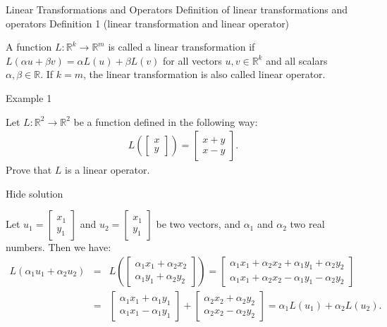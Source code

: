  
Linear Transformations and Operators
Definition of linear transformations and operators
Definition 1 (linear transformation and linear operator)


A function \( L:\mathbb R^k\to\mathbb R^m \) is called a linear transformation if \( L(\alpha u+\beta v)=\alpha L(u)+\beta L(v) \) for all vectors \( u,v\in\mathbb R^k \) and all scalars \( \alpha,\beta\in\mathbb R \). If \( k=m \), the linear transformation is also called linear operator.

Example 1

Let \( L:\mathbb R^2\to\mathbb R^2 \) be a function defined in the following way: \begin{eqnarray*}L\left(\left[\begin{array}{c}x\\y\end{array}\right]\right)=\left[\begin{array}{c}x+y\\x-y\end{array}\right].\end{eqnarray*} Prove that \( L \) is a linear operator.

Hide solution

Let \( u_1=\left[\begin{array}{c}x_1\\y_1\end{array}\right]\) and \( u_2=\left[\begin{array}{c}x_1\\y_1\end{array}\right]\) be two vectors, and \( \alpha_1 \) and \( \alpha_2 \) two real numbers. Then we have: \begin{eqnarray*} L\left(\alpha_1 u_1+\alpha_2u_2\right)&=&L\left(\left[\begin{array}{c}\alpha_1x_1+\alpha_2x_2\\ \alpha_1y_1+\alpha_2y_2\end{array}\right]\right) = \left[\begin{array}{c}\alpha_1x_1+\alpha_2x_2+\alpha_1y_1+\alpha_2y_2\\\alpha_1x_1+\alpha_2x_2-\alpha_1y_1-\alpha_2y_2\end{array}\right]\\ &=& \left[\begin{array}{c}\alpha_1x_1+ \alpha_1y_1 \\\alpha_1x_1 -\alpha_1y_1 \end{array}\right]+\left[\begin{array}{c} \alpha_2x_2 +\alpha_2y_2\\ \alpha_2x_2-\alpha_2y_2\end{array}\right]=\alpha_1L(u_1)+\alpha_2L(u_2). \end{eqnarray*}

